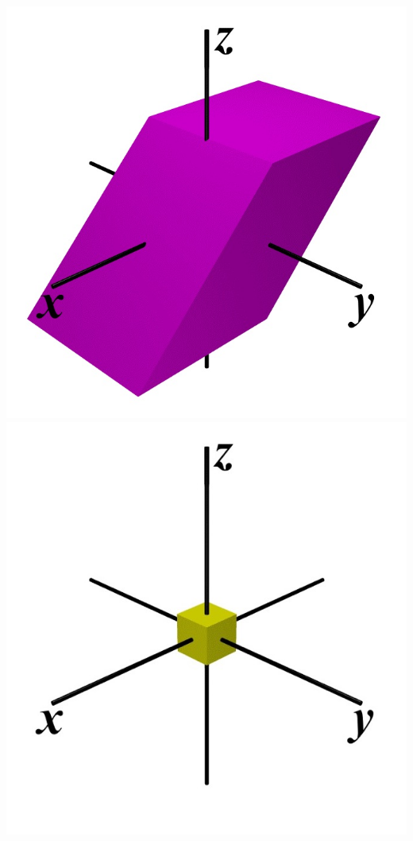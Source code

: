\documentclass[crop=false]{standalone}
\begin{document}
\vspace{0.05\linewidth}
\begin{center}
  \includegraphics[width=0.2\linewidth]{thesis/appendices/import/imgs/distortion.jpeg}%
  \includegraphics[width=0.2\linewidth]{thesis/appendices/import/imgs/dilation.jpeg}
  \label{fig:rot_trans}
\end{center}
\vspace{0.05\linewidth}
\end{document}
